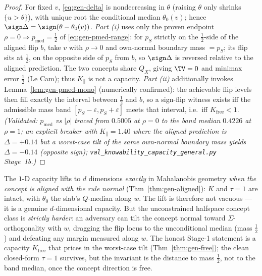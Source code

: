 \begin{proof}
For fixed $v$, \eqref{eq:gen-delta} is nondecreasing in $\theta$ (raising $\theta$
only shrinks $\{u>\theta\}$), with unique root the conditional median $\theta_0(v)$;
hence $\sign\Delta=\sign(\theta-\theta_0(v))$. \emph{Part (i)} uses only the proven
endpoint $\rho=0\Rightarrow p_{\mathrm{med}}=\tfrac12$ of \eqref{eq:gen-pmed-range}: for
$p_S$ strictly on the $\tfrac12$-side of the aligned flip $b$, take $v$ with $\rho\to0$
and own-normal boundary mass $=p_S$; its flip sits at $\tfrac12$, on the opposite side of
$p_S$ from $b$, so $\sign\Delta$ is reversed relative to the aligned prediction. The two
concepts share $Q_X$, giving $\TV=0$ and minimax error $\tfrac12$ (Le Cam); thus
$K_\parallel$ is not a capacity. \emph{Part (ii)} additionally invokes
Lemma~\ref{lem:gen-pmed-mono} (numerically confirmed): the achievable flip levels then
fill exactly the interval between $\tfrac12$ and $b$, so a sign-flip witness exists iff
the admissible mass band $[p_S-\varepsilon,p_S+\varepsilon]$ meets that interval, i.e.\
iff $K_{\mathrm{free}}<1$. \emph{(Validated:
$p_{\mathrm{med}}$ vs $|\rho|$ traced from $0.5005$ at $\rho{=}0$ to the band median
$0.4226$ at $\rho{=}1$; an explicit breaker with $K_\parallel=1.40$ where the aligned
prediction is $\Delta=+0.14$ but a worst-case tilt of the same own-normal boundary
mass yields $\Delta=-0.14$ (opposite sign);
\texttt{val\_knowability\_capacity\_general.py} Stage~1b.)}
\end{proof}

\begin{remark}\label{rmk:gen-stage1}
The $1$-D capacity lifts to $d$ dimensions \emph{exactly} in Mahalanobis geometry
\emph{when the concept is aligned with the rule normal} (Thm~\ref{thm:gen-aligned}):
$K$ and $\tau=1$ are intact, with $\theta_0$ the slab's $Q$-median along $w$. The lift
is therefore not vacuous --- it is a genuine $d$-dimensional capacity. But the
unconstrained halfspace concept class is \emph{strictly harder}: an adversary can tilt
the concept normal toward $\Sigma$-orthogonality with $w$, dragging the flip locus to
the unconditional median (mass $\tfrac12$) and defeating any margin measured along
$w$. The honest Stage-1 statement is a capacity $K_{\mathrm{free}}$ that prices in the
worst-case tilt (Thm~\ref{thm:gen-free}); the clean closed-form $\tau=1$ survives, but
the invariant is the distance to mass $\tfrac12$, not to the band median, once the
concept direction is free.
\end{remark}

